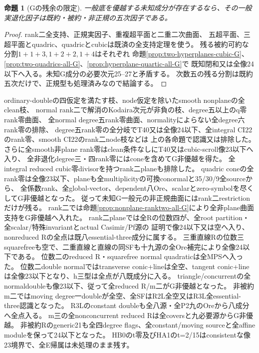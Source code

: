 \documentclass[a4paper,11pt]{ltjsarticle}
\newtheorem{proposition}{命題}[section]
\theoremstyle{definition}
\begin{document}
\begin{proposition}[Gの残余の限定]\label{prop:G-only-irreducible-nonnormal}
一般底を優越する未知成分が存在するなら、その一般実退化因子は既約・被約・非正規の五次因子である。
\end{proposition}
\begin{proof}
rank二全支持、正規実因子、重複超平面と二重二次曲面、
五超平面、三超平面とquadric、quadricとcubicは既済の全支持定理を使う。
残る被約可約な分割$1+1+3,1+2+2,1+4$はそれぞれ
命題\ref{prop:two-hyperplanes-cubic-G}、\ref{prop:two-quadrics-all-G}、\ref{prop:hyperplane-quartic-all-G}で
既知閉和又は全像24以下へ入る。未知G成分の必要次元25--27と矛盾する。
次数五の残る分割は既約五次だけで、正規型も処理済みなので結論する。
\end{proof}
ordinary-doubleの四仮定を満たす枝、node仮定を除いたsmooth nonplaneの全clean枝、
normal rank二で解消のKodaira次元が非負の枝、degree五以上のq零rank零曲面、
全normal degree五rank零曲面、normalityによらない全degree六rank零の排除、
degree五rank零の全分岐でT40又は全像24以下、全integral CI22のrank零、smooth CI22のrank二node枝などは
上の各命題で認識又は排除した。
さらに全smooth非plane rank零はclean条件なしにT40又はcubic-scroll像23以下へ入り、
全非退化degree三・四rank零にはconeを含めてG非優越を得た。
全integral reduced cubic零divisorを持つrank二planeも排除した。
quadric coneの全rank零は全像23以下、planeも全multiplicityの可換conormalと35/30/9全sourceから、
全係数rank、全global-vector、dependent八Ore、scalarとzero-symbolを尽くしてG非優越となった。
従って未知G一般元の非正規曲面にはrank二restrictionだけが残る。
rank二では命題\ref{prop:nonplane-ranktwo-all-G}により全非plane曲面支持をG非優越へ入れた。
rank二planeでは全Rの位数四が、全root partition・全scalar/特殊invariantとactual Casimir/Pf源の
証明で像24以下又は空へ入り、nonreduced Rの全点は既八essential-three成分に属する。
三重直線Rの位数三squarefreeも空で、二重直線と直線の同SFも十九源の全Ore補完により全像24以下である。
位数二のreduced R・squarefree normal quadraticは全MPSへ入った。
位数二double normalではtransverse conic+lineは全空、tangent conic+lineは全像23以下となり、h三型は全点が八既成分に入る。
triangle/concurrentの全normaldoubleも像23以下、従って全reduced R/m二がG非優越となった。
非被約m二ではmoving degree一doubleが全空、全SFはR2L全空又はR3L全essential-three認識となった。
R3Lのconstant doubleも全八源・全P2九のOreから八成分へ全点入る。
m三の全nonconcurrent reduced Rは全coversと九必要源からG非優越。
非被約Rのgeneric21も全四degree flags、全constant/moving sourceと全affine moduleを保って24以下となった。
HB0のt零及びHA1のt=2/15はconsistentな像23境界で、全E帰属は未処理のまま残す。
\end{document}
